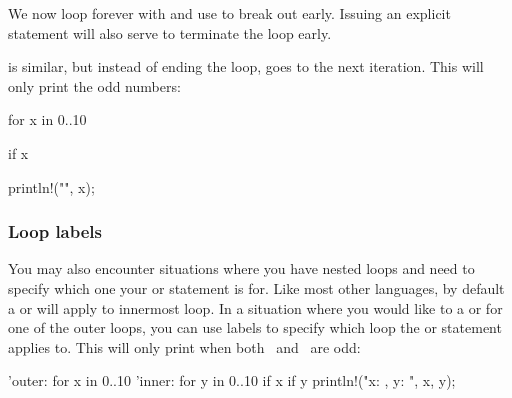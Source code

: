 We now loop forever with  and use  to break out early. Issuing an explicit  statement will also 
serve to terminate the loop early.

\blank

 is similar, but instead of ending the loop, goes to the next iteration. This will only print the odd numbers:

\begin{rustc}
for x in 0..10 {
    if x %

    println!("{}", x);
}
\end{rustc}

\subsubsection*{Loop labels}

You may also encounter situations where you have nested loops and need to specify which one your  or  
statement is for. Like most other languages, by default a  or  will apply to innermost loop. In a situation where you would like to a  or  for one of the outer loops, you can use labels to specify which loop the 
 or  statement applies to. This will only print when both \x\ and \y\ are odd:

\begin{rustc}
'outer: for x in 0..10 {
    'inner: for y in 0..10 {
        if x %
        if y %
        println!("x: {}, y: {}", x, y);
    }
}
\end{rustc}
